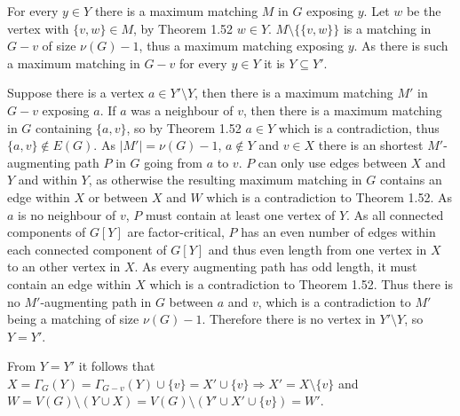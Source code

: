 \documentclass{article}
\begin{document}
  For every $y\in Y$ there is a maximum matching $M$ in $G$ exposing $y$. Let $w$ be the vertex with $\{v,w\}\in M$, by Theorem 1.52 $w\in Y$. $M\setminus \{\{v,w\}\}$ is a matching in $G-v$  of size $\nu(G)-1$, thus a maximum matching exposing $y$. As there is such a maximum  matching in $G-v$ for every $y\in Y$ it is $Y\subseteq Y'$.

  Suppose there is a vertex $a\in Y'\setminus Y$, then there is a maximum matching $M'$ in $G-v$ exposing $a$. If $a$ was a neighbour of $v$, then there is a maximum matching in $G$ containing $\{a,v\}$, so by Theorem 1.52 $a\in Y$ which is a contradiction, thus $\{a,v\}\notin E(G)$. As $|M'|=\nu(G)-1$, $a\notin Y$ and $v\in X$ there is an shortest $M'$-augmenting path $P$ in $G$ going from $a$ to $v$. %
  $P$ can only use edges between $X$ and $Y$ and within $Y$, as otherwise the resulting maximum matching in $G$ contains an edge within $X$ or between $X$ and $W$ which is a contradiction to Theorem 1.52. As $a$ is no neighbour of $v$, $P$ must contain at least one vertex of $Y$. As all connected components of $G[Y]$ are factor-critical, $P$ has an even number of edges within each connected component of $G[Y]$ and thus even length from one vertex in $X$ to an other vertex in $X$. As every augmenting path has odd length, it must contain an edge within $X$ which is a contradiction to Theorem 1.52. Thus there is no $M'$-augmenting path in $G$ between $a$ and $v$, which is a contradiction to $M'$ being a matching of size $\nu(G)-1$. Therefore there is no vertex in $Y'\setminus Y$, so $Y=Y'$.

  From $Y=Y'$ it follows that $X=\Gamma_{G}(Y)=\Gamma_{G-v}(Y)\cup \{v\}=X' \cup \{v\} \Rightarrow X' = X \setminus \{v\}$ and $W=V(G)\setminus (Y\cup X)=V(G)\setminus (Y'\cup X'\cup \{v\})=W'$.
\end{document}
